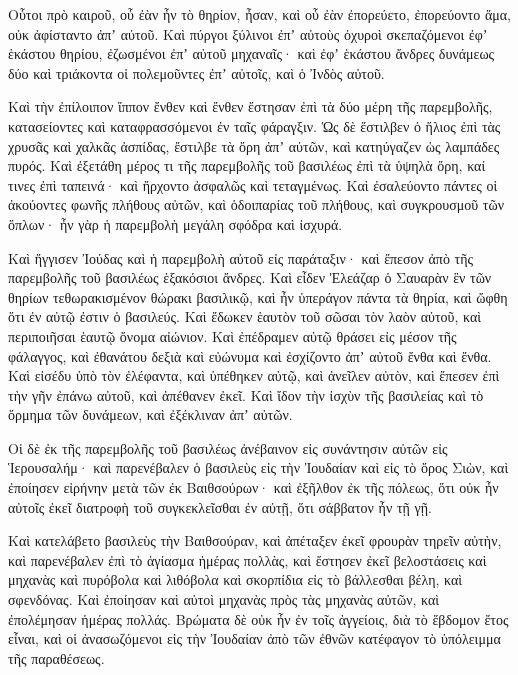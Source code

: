 {Οὗτοι πρὸ καιροῦ, οὗ ἐὰν ἦν τὸ θηρίον, ἦσαν, καὶ οὗ ἐὰν ἐπορεύετο, ἐπορεύοντο ἅμα, οὐκ ἀφίσταντο ἀπʼ αὐτοῦ.
Καὶ πύργοι ξύλινοι ἐπʼ αὐτοὺς ὀχυροὶ σκεπαζόμενοι ἐφʼ ἑκάστου θηρίου, ἐζωσμένοι ἐπʼ αὐτοῦ μηχαναῖς· καὶ ἐφʼ ἑκάστου ἄνδρες δυνάμεως δύο καὶ τριάκοντα οἱ πολεμοῦντες ἐπʼ αὐτοῖς, καὶ ὁ Ἰνδὸς αὐτοῦ.
\par }{\PP {}Καὶ τὴν ἐπίλοιπον ἵππον ἔνθεν καὶ ἔνθεν ἔστησαν ἐπὶ τὰ δύο μέρη τῆς παρεμβολῆς, κατασείοντες καὶ καταφρασσόμενοι ἐν ταῖς φάραγξιν.
Ὡς δὲ ἔστιλβεν ὁ ἥλιος ἐπὶ τὰς χρυσᾶς καὶ χαλκᾶς ἀσπίδας, ἔστιλβε τὰ ὄρη ἀπʼ αὐτῶν, καὶ κατηύγαζεν ὡς λαμπάδες πυρός.
Καὶ ἐξετάθη μέρος τι τῆς παρεμβολῆς τοῦ βασιλέως ἐπὶ τὰ ὑψηλὰ ὄρη, καί τινες ἐπὶ ταπεινά· καὶ ἤρχοντο ἀσφαλῶς καὶ τεταγμένως.
Καὶ ἐσαλεύοντο πάντες οἱ ἀκούοντες φωνῆς πλήθους αὐτῶν, καὶ ὁδοιπαρίας τοῦ πλήθους, καὶ συγκρουσμοῦ τῶν ὅπλων· ἦν γὰρ ἡ παρεμβολὴ μεγάλη σφόδρα καὶ ἰσχυρά.
\par }{\PP {}Καὶ ἤγγισεν Ἰούδας καὶ ἡ παρεμβολὴ αὐτοῦ εἰς παράταξιν· καὶ ἔπεσον ἀπὸ τῆς παρεμβολῆς τοῦ βασιλέως ἑξακόσιοι ἄνδρες.
Καὶ εἶδεν Ἐλεάζαρ ὁ Σαυαρὰν ἓν τῶν θηρίων τεθωρακισμένον θώρακι βασιλικῷ, καὶ ἦν ὑπεράγον πάντα τὰ θηρία, καὶ ὤφθη ὅτι ἐν αὐτῷ ἐστιν ὁ βασιλεύς.
Καὶ ἔδωκεν ἑαυτὸν τοῦ σῶσαι τὸν λαὸν αὐτοῦ, καὶ περιποιῆσαι ἑαυτῷ ὄνομα αἰώνιον.
Καὶ ἐπέδραμεν αὐτῷ θράσει εἰς μέσον τῆς φάλαγγος, καὶ ἐθανάτου δεξιὰ καὶ εὐώνυμα καὶ ἐσχίζοντο ἀπʼ αὐτοῦ ἔνθα καὶ ἔνθα.
Καὶ εἰσέδυ ὑπὸ τὸν ἐλέφαντα, καὶ ὑπέθηκεν αὐτῷ, καὶ ἀνεῖλεν αὐτὸν, καὶ ἔπεσεν ἐπὶ τὴν γῆν ἐπάνω αὐτοῦ, καὶ ἀπέθανεν ἐκεῖ.
Καὶ ἴδον τὴν ἰσχὺν τῆς βασιλείας καὶ τὸ ὅρμημα τῶν δυνάμεων, καὶ ἐξέκλιναν ἀπʼ αὐτῶν.
\par }{\PP {}Οἱ δὲ ἐκ τῆς παρεμβολῆς τοῦ βασιλέως ἀνέβαινον εἰς συνάντησιν αὐτῶν εἰς Ἱερουσαλήμ· καὶ παρενέβαλεν ὁ βασιλεὺς εἰς τὴν Ἰουδαίαν καὶ εἰς τὸ ὄρος Σιὼν,
καὶ ἐποίησεν εἰρήνην μετὰ τῶν ἐκ Βαιθσούρων· καὶ ἐξῆλθον ἐκ τῆς πόλεως, ὅτι οὐκ ἦν αὐτοῖς ἐκεῖ διατροφὴ τοῦ συγκεκλεῖσθαι ἐν αὐτῇ, ὅτι σάββατον ἦν τῇ γῇ.
\par }{\PP {}Καὶ κατελάβετο βασιλεὺς τὴν Βαιθσούραν, καὶ ἀπέταξεν ἐκεῖ φρουρὰν τηρεῖν αὐτὴν,
καὶ παρενέβαλεν ἐπὶ τὸ ἁγίασμα ἡμέρας πολλὰς, καὶ ἔστησεν ἐκεῖ βελοστάσεις καὶ μηχανὰς καὶ πυρόβολα καὶ λιθόβολα καὶ σκορπίδια εἰς τὸ βάλλεσθαι βέλη, καὶ σφενδόνας.
Καὶ ἐποίησαν καὶ αὐτοὶ μηχανὰς πρὸς τὰς μηχανὰς αὐτῶν, καὶ ἐπολέμησαν ἡμέρας πολλάς.
Βρώματα δὲ οὐκ ἦν ἐν τοῖς ἀγγείοις, διὰ τὸ ἕβδομον ἔτος εἶναι, καὶ οἱ ἀνασωζόμενοι εἰς τὴν Ἰουδαίαν ἀπὸ τῶν ἐθνῶν κατέφαγον τὸ ὑπόλειμμα τῆς παραθέσεως.
}
